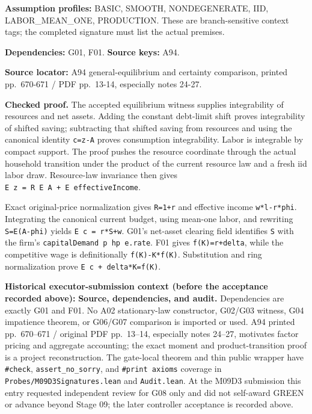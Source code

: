 \documentclass[
  11pt,
]{article}
\let\LedgerOriginalTexttt\texttt
\renewcommand{\texttt}[1]{{\small\LedgerOriginalTexttt{#1}}}
\begin{document}
\textbf{Assumption profiles:} BASIC, SMOOTH, NONDEGENERATE, IID,
LABOR\_MEAN\_ONE, PRODUCTION. These are branch-sensitive context tags;
the completed signature must list the actual premises.

\textbf{Dependencies:} G01, F01. \textbf{Source keys:} A94.

\textbf{Source locator:} A94 general-equilibrium and certainty
comparison, printed pp.~670-671 / PDF pp.~13-14, especially notes 24-27.

\textbf{Checked proof.} The accepted equilibrium witness supplies
integrability of resources and net assets. Adding the constant
debt-limit shift proves integrability of shifted saving; subtracting
that shifted saving from resources and using the canonical identity
\texttt{c=z-A} proves consumption integrability. Labor is integrable by
compact support. The proof pushes the resource coordinate through the
actual household transition under the product of the current resource
law and a fresh iid labor draw. Resource-law invariance then gives
\texttt{E\ z\ =\ R\ E\ A\ +\ E\ effectiveIncome}.

Exact original-price normalization gives \texttt{R=1+r} and effective
income \texttt{w*l-r*phi}. Integrating the canonical current budget,
using mean-one labor, and rewriting \texttt{S=E(A-phi)} yields
\texttt{E\ c\ =\ r*S+w}. G01's net-asset clearing field identifies
\texttt{S} with the firm's \texttt{capitalDemand\ p\ hp\ e.rate}. F01
gives \texttt{f\textquotesingle{}(K)=r+delta}, while the competitive
wage is definitionally \texttt{f(K)-K*f\textquotesingle{}(K)}.
Substitution and ring normalization prove
\texttt{E\ c\ +\ delta*K=f(K)}.

\textbf{Historical executor-submission context (before the acceptance
recorded above):} \textbf{Source, dependencies, and audit.} Dependencies
are exactly G01 and F01. No A02 stationary-law constructor, G02/G03
witness, G04 impatience theorem, or G06/G07 comparison is imported or
used. A94 printed pp.~670--671 / original PDF pp.~13--14, especially
notes 24--27, motivates factor pricing and aggregate accounting; the
exact moment and product-transition proof is a project reconstruction.
The gate-local theorem and thin public wrapper have \texttt{\#check},
\texttt{assert\_no\_sorry}, and \texttt{\#print\ axioms} coverage in
\texttt{Probes/M09D3Signatures.lean} and \texttt{Audit.lean}. At the
M09D3 submission this entry requested independent review for G08 only
and did not self-award GREEN or advance beyond Stage 09; the later
controller acceptance is recorded above.
\end{document}

